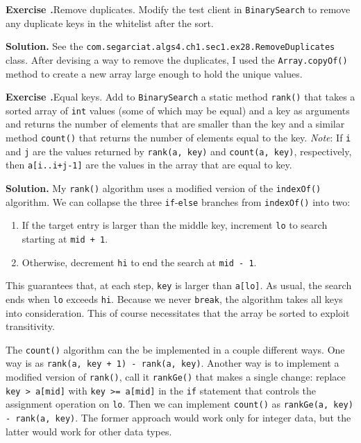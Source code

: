 \documentclass[12pt, a4paper]{article}
\newenvironment{ex}[2][Exercise]
{\par\medskip\noindent \textbf{#1 #2.}}
{\medskip}
\newenvironment{sol}[1][Solution]
{\par\medskip\noindent \textbf{#1.} }
{\medskip}
\begin{document}
	\begin{ex}{28}
		\emph{Remove duplicates}. Modify the test client in \texttt{BinarySearch} to remove
		any duplicate keys in the whitelist after the sort.
	\end{ex}
	\begin{sol}
		See the \texttt{com.segarciat.algs4.ch1.sec1.ex28.RemoveDuplicates} class.
		After devising a way to remove the duplicates, I used the \texttt{Array.copyOf()}
		method to create a new array large enough to hold the unique values.
	\end{sol}
	\begin{ex}{29}
		\emph{Equal keys}. Add to \texttt{BinarySearch} a static method \texttt{rank()}
		that takes a sorted array of \texttt{int} values (some of which may be equal) and
		a key as arguments and returns the number of elements that are smaller than the key
		and a similar  method \texttt{count()} that returns the number of elements equal
		to the key. \emph{Note}: If \texttt{i} and \texttt{j} are the values returned by
		\texttt{rank(a, key)} and \texttt{count(a, key)}, respectively, then \texttt{a[i..i+j-1]}
		are the values in the array that are equal to key.
	\end{ex}
	\begin{sol}
		My \texttt{rank()} algorithm uses a modified version of the \texttt{indexOf()}
		algorithm. We can collapse the three \texttt{if}-\texttt{else} branches
		from \texttt{indexOf()} into two:
		\begin{enumerate}[label=(\roman*)]
			\item If the target entry is larger than the middle key, increment \texttt{lo}
			to search starting at \texttt{mid + 1}.
			\item Otherwise, decrement \texttt{hi} to end the search at \texttt{mid - 1}.
		\end{enumerate}
		This guarantees that, at each step, \texttt{key} is larger than \texttt{a[lo]}.
		As usual, the search ends when \texttt{lo} exceeds \texttt{hi}. Because we never
		\texttt{break}, the algorithm takes all keys into consideration. This of course
		necessitates that the array be sorted to exploit transitivity.
		
		The \texttt{count()} algorithm can the be implemented in a couple different ways.
		One way is as \texttt{rank(a, key + 1) - rank(a, key)}. Another way is to implement
		a modified version of \texttt{rank()}, call it \texttt{rankGe()} that makes a single
		change: replace \texttt{key > a[mid]} with \texttt{key >= a[mid]} in the \texttt{if}
		statement that controls the assignment operation on \texttt{lo}. Then we can implement
		\texttt{count()} as \texttt{rankGe(a, key) - rank(a, key)}. The former approach would
		work only for integer data, but the latter would work for other data types.
	\end{sol}
\end{document}
